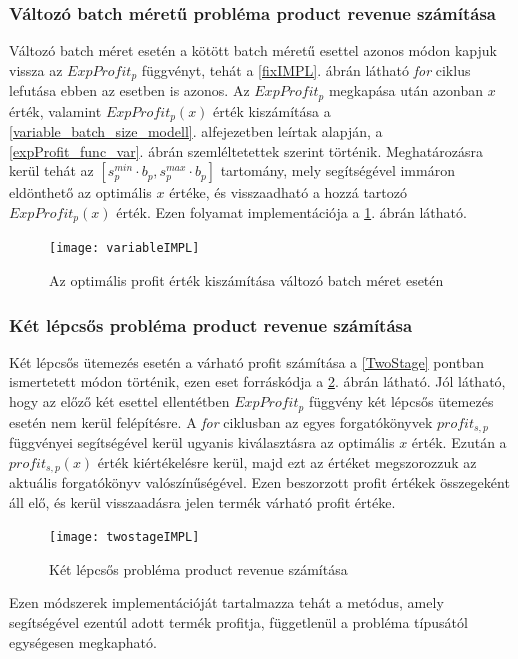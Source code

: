 \subsubsection{Változó batch méretű probléma product revenue számítása}
Változó batch méret esetén a kötött batch méretű esettel azonos módon kapjuk vissza az $ExpProfit_p$ függvényt, tehát a \ref{fixIMPL}. ábrán látható \textit{for} ciklus lefutása ebben az esetben is azonos.
Az $ExpProfit_p$ megkapása után azonban $x$ érték, valamint $ExpProfit_p(x)$ érték kiszámítása a \ref{variable_batch_size_modell}. alfejezetben leírtak alapján, a \ref{expProfit_func_var}. ábrán szemléltetettek szerint történik.
Meghatározásra kerül tehát az  $[s_p^{min} \cdot b_p , s_p^{max} \cdot b_p]$ tartomány, mely segítségével immáron eldönthető az optimális $x$ értéke, és visszaadható a hozzá tartozó  $ExpProfit_p(x)$ érték. 
Ezen folyamat implementációja a \ref{variableIMPL}. ábrán látható.
\begin{figure}
\begin{center}
\texttt{[image: variableIMPL]}
\caption{Az optimális profit érték kiszámítása változó batch méret esetén}
\label{variableIMPL}
\end{center}
\end{figure} 
\subsubsection{Két lépcsős probléma product revenue számítása}
Két lépcsős ütemezés esetén a várható profit számítása a \ref{TwoStage} pontban ismertetett módon történik, ezen eset forráskódja a \ref{twostageIMPL}. ábrán látható.
Jól látható, hogy az előző két esettel ellentétben  $ExpProfit_p$ függvény két lépcsős ütemezés esetén nem kerül felépítésre.
A \textit{for} ciklusban az egyes forgatókönyvek $profit_{s,p}$ függvényei segítségével kerül ugyanis kiválasztásra az optimális $x$ érték.
Ezután a $profit_{s,p}(x)$ érték kiértékelésre kerül, majd ezt az értéket megszorozzuk az aktuális forgatókönyv valószínűségével.
Ezen beszorzott profit értékek összegeként áll elő, és kerül visszaadásra jelen termék várható profit értéke.
\begin{figure}[H]
\begin{center}
\texttt{[image: twostageIMPL]}
\caption{Két lépcsős probléma product revenue számítása}
\label{twostageIMPL}
\end{center}
\end{figure} 

Ezen módszerek implementációját tartalmazza tehát a  metódus, amely segítségével ezentúl adott termék profitja, függetlenül a probléma típusától egységesen megkapható.
